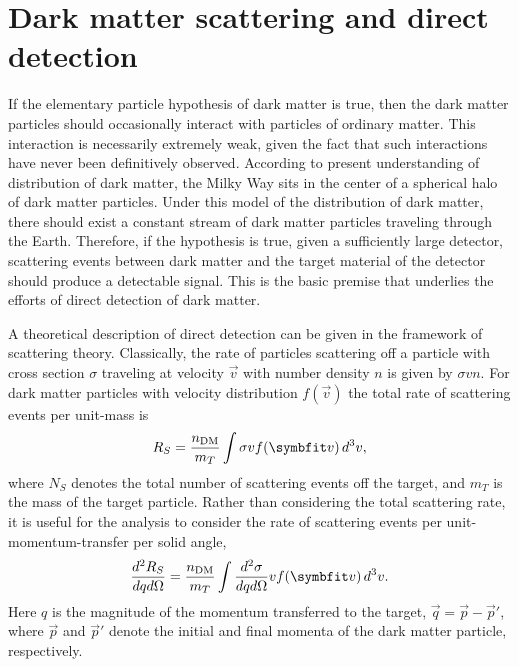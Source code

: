 \chapter{Dark matter scattering and direct detection}
\label{chap:direct-detection}

If the elementary particle hypothesis of dark matter is true, then the dark matter particles should occasionally interact with particles of ordinary matter. This interaction is necessarily extremely weak, given the fact that such interactions have never been definitively observed. According to present understanding of distribution of dark matter, the Milky Way sits in the center of a spherical halo of dark matter particles. Under this model of the distribution of dark matter, there should exist a constant stream of dark matter particles traveling through the Earth. Therefore, if the hypothesis is true, given a sufficiently large detector, scattering events between dark matter and the target material of the detector should produce a detectable signal. This is the basic premise that underlies the efforts of direct detection of dark matter.

A theoretical description of direct detection can be given in the framework of scattering theory. Classically, the rate of particles scattering off a particle with cross section $\sigma$ traveling at velocity $\vec{v}$ with number density $n$ is given by $\sigma vn$. For dark matter particles with velocity distribution $f(\vec{v})$ the total rate of scattering events per unit-mass is
\begin{equation}
    R_S=\frac{n_\text{DM}}{m_T}\int\sigma vf(\vec{v})\difd^3v,
\end{equation}
where $N_S$ denotes the total number of scattering events off the target, and $m_T$ is the mass of the target particle. Rather than considering the total scattering rate, it is useful for the analysis to consider the rate of scattering events per unit-momentum-transfer per solid angle,
\begin{equation}
    \ddder{R_S}{q}{\Omega}=\frac{n_\text{DM}}{m_T}\int\ddder{\sigma}{q}{\Omega}vf(\vec{v})\difd^3{v}.
\end{equation}
Here $q$ is the magnitude of the momentum transferred to the target, $\vec{q}=\vec{p}-\vec{p}'$, where $\vec{p}$ and $\vec{p}'$ denote the initial and final momenta of the dark matter particle, respectively.

